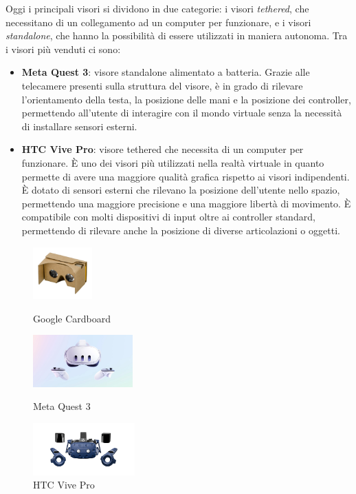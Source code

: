 Oggi i principali visori si dividono in due categorie: i visori \textit{tethered},
che necessitano di un collegamento ad un computer per funzionare, e i visori \textit{standalone},
che hanno la possibilità di essere utilizzati in maniera autonoma. Tra i visori
più venduti ci sono:

\begin{itemize}
  \item \textbf{Meta Quest 3}: visore standalone alimentato a batteria. Grazie
    alle telecamere presenti sulla struttura del visore, è in grado di rilevare l'orientamento
    della testa, la posizione delle mani e la posizione dei controller, permettendo
    all'utente di interagire con il mondo virtuale senza la necessità di installare
    sensori esterni.

  \item \textbf{HTC Vive Pro}: visore tethered che necessita di un computer per funzionare.
    È uno dei visori più utilizzati nella realtà virtuale in quanto permette di
    avere una maggiore qualità grafica rispetto ai visori indipendenti. È dotato
    di sensori esterni che rilevano la posizione dell'utente nello spazio,
    permettendo una maggiore precisione e una maggiore libertà di movimento. È compatibile
    con molti dispositivi di input oltre ai controller standard, permettendo di
    rilevare anche la posizione di diverse articolazioni o oggetti.
\end{itemize}

\begin{figure}[h!]
  \centering
  \begin{minipage}{0.3\textwidth} %
    \centering
    \includegraphics[height=2cm]{images/GoogleCardboard.jpg} %
    \caption{Google Cardboard}
    \label{fig:googlecardboard}
  \end{minipage}
  \hfill
  \begin{minipage}{0.3\textwidth} %
    \centering
    \includegraphics[height=2cm]{images/Quest3.png} %
    \caption{Meta Quest 3}
    \label{fig:quest3}
  \end{minipage}
  \hfill
  \begin{minipage}{0.3\textwidth} %
    \centering
    \includegraphics[height=2cm]{images/HtcVice.png} %
    \caption{HTC Vive Pro}
    \label{fig:htcvive}
  \end{minipage}
\end{figure}


